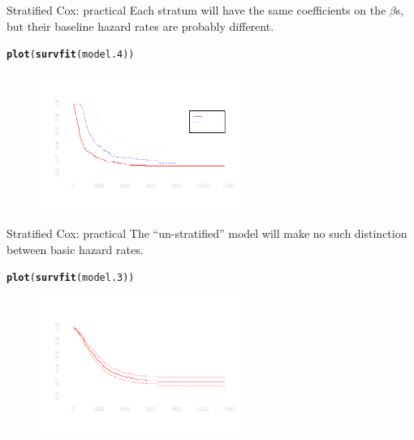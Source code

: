 \documentclass[12pt,english,pdf,xcolor=dvipsnames,aspectratio=169,handout]{beamer}\usepackage[]{graphicx}\usepackage[]{xcolor}
\makeatletter
\newcommand{\hlstd}[1]{\textcolor[rgb]{0.345,0.345,0.345}{#1}}%
\newcommand{\hlkwd}[1]{\textcolor[rgb]{0.737,0.353,0.396}{\textbf{#1}}}%
\newenvironment{kframe}{%
 \def\at@end@of@kframe{}%
 \ifinner\ifhmode%
  \def\at@end@of@kframe{\end{minipage}}%
  \begin{minipage}{\columnwidth}%
 \fi\fi%
 \def\FrameCommand##1{\hskip\@totalleftmargin \hskip-\fboxsep
 \colorbox{shadecolor}{##1}\hskip-\fboxsep
     \hskip-\linewidth \hskip-\@totalleftmargin \hskip\columnwidth}%
 \MakeFramed {\advance\hsize-\width
   \@totalleftmargin\z@ \linewidth\hsize
   \@setminipage}}%
 {\par\unskip\endMakeFramed%
 \at@end@of@kframe}
\newenvironment{knitrout}{}{} %
\makeatother
\begin{document}
\begin{frame}[fragile]{Stratified Cox: practical}
Each stratum will have the same coefficients on the $\beta$s, but their baseline hazard rates are probably different. \bigskip

\begin{knitrout}\tiny
{}\color{fgcolor}\begin{kframe}
\begin{alltt}
\hlkwd{plot}\hlstd{(}\hlkwd{survfit}\hlstd{(model.4))}
\end{alltt}
\end{kframe}
\end{knitrout}



\begin{figure}
\centering
\includegraphics[width=0.6\textwidth]{../03-graphs/02-07.pdf}
\end{figure}
\end{frame}



\begin{frame}[fragile]{Stratified Cox: practical}
The ``un-stratified'' model will make no such distinction between basic hazard rates.\bigskip

\begin{knitrout}\tiny
{}\color{fgcolor}\begin{kframe}
\begin{alltt}
\hlkwd{plot}\hlstd{(}\hlkwd{survfit}\hlstd{(model.3))}
\end{alltt}
\end{kframe}
\end{knitrout}



\begin{figure}
\centering
\includegraphics[width=0.6\textwidth]{../03-graphs/02-08.pdf}
\end{figure}
\end{frame}
\end{document}
